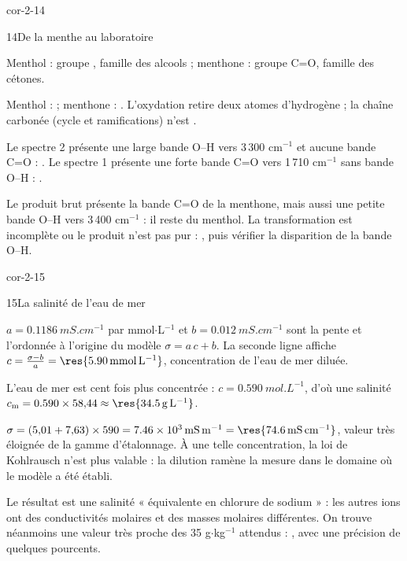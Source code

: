 \begin{blocLivre}{cor-2-14}
\begin{corrige}{14}{De la menthe au laboratoire}
\begin{questions}
\item Menthol : groupe  , famille des alcools ; menthone : groupe
 C=O, famille des cétones.
\item Menthol :  ; menthone : . L'oxydation retire deux atomes d'hydrogène ; la chaîne
carbonée (cycle et ramifications) n'est .
\item Le spectre 2 présente une large bande O--H vers 3\,300 cm$^{-1}$ et aucune bande C=O : .
Le spectre 1 présente une forte bande C=O vers 1\,710 cm$^{-1}$ sans bande O--H : .
\item Le produit brut présente la bande C=O de la menthone, mais aussi une petite bande O--H vers 3\,400 cm$^{-1}$ :
il reste du menthol. La transformation est incomplète ou le produit n'est pas pur : ,
puis vérifier la disparition de la bande O--H.
\end{questions}
\end{corrige}
\end{blocLivre}
\begin{blocLivre}{cor-2-15}
\begin{corrige}{15}{La salinité de l'eau de mer}
\begin{questions}
\item $a=\qty{0,1186}{mS.cm^{-1}}$ par mmol$\cdot$L$^{-1}$ et $b=\qty{0,012}{mS.cm^{-1}}$ sont la pente et l'ordonnée
à l'origine du modèle $\sigma=a\,c+b$. La seconde ligne affiche $c=\frac{\sigma-b}{a}=\res{\qty{5,90}{mmol.L^{-1}}}$,
concentration de l'eau de mer diluée.
\item L'eau de mer est cent fois plus concentrée : $c=\qty{0,590}{mol.L^{-1}}$, d'où une salinité
$c_\mathrm{m}=\num{0.590}\times58{,}44\approx\res{\qty{34,5}{g.L^{-1}}}$.
\item $\sigma=(5{,}01+7{,}63)\times590=\qty{7,46e3}{mS.m^{-1}}=\res{\qty{74,6}{mS.cm^{-1}}}$, valeur très éloignée de
la gamme d'étalonnage. À une telle concentration, la loi de Kohlrausch n'est plus valable : la dilution ramène
la mesure dans le domaine où le modèle a été établi.
\item Le résultat est une salinité « équivalente en chlorure de sodium » : les autres ions ont des conductivités
molaires et des masses molaires différentes. On trouve néanmoins une valeur très proche des 35 g$\cdot$kg$^{-1}$
attendus : , avec une précision de quelques pourcents.
\end{questions}
\end{corrige}
\end{blocLivre}
